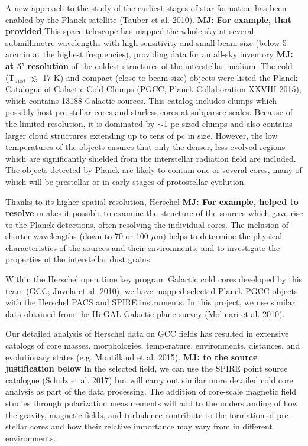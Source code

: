 \documentclass[11pt]{amsart}
\begin{document}
A new approach to the study of the earliest stages of star formation
has been enabled by the Planck satellite (Tauber et al.
2010). {\bf MJ: For example, that provided} 
This space telescope has mapped the whole sky at several
submillimetre wavelengths with high sensitivity and small
beam size (below 5 arcmin
at the highest frequencies), providing data
for an all-sky inventory 
{\bf MJ: at 5' resolution}
of the coldest structures of the interstellar
medium. 
The cold (T$_{dust}$ $\lesssim$ 17 K) and compact (close to beam
size) objects were listed the Planck Catalogue of Galactic Cold Clumps (PGCC, Planck
Collaboration XXVIII 2015), which contains 13188 Galactic
sources. 
This  catalog includes clumps
which possibly host pre-stellar cores and starless cores at subparsec
scales. Because of the limited resolution, it is dominated
by $\sim$1 pc sized clumps and also contains larger cloud structures
extending up to tens of pc in size. However, the low temperatures
of the objects ensures that only the denser, less evolved
regions which are significantly shielded from the interstellar radiation
field are included. The objects detected by Planck are
likely to contain one or several cores, many of which will be prestellar
or in early stages of protostellar evolution. 

Thanks to its higher spatial resolution, 
Herschel 
{\bf MJ: For example, helped to resolve} m
akes it possible to examine the structure of the
sources which gave rise to the Planck detections, often resolving
the individual cores. The inclusion of shorter wavelengths
(down to 70 or 100 $\mu$m) helps to determine the physical characteristics
of the sources and their environments, and to investigate
the properties of the interstellar dust grains. 

Within the Herschel open time key program Galactic
cold cores developed by this team (GCC; Juvela et al. 2010), we have mapped selected
Planck PGCC objects with the Herschel PACS
and SPIRE
instruments. 
In this project, we use similar data obtained from the Hi-GAL Galactic plane survey (Molinari et al. 2010).

Our detailed analysis of Herschel data on GCC fields has resulted in extensive catalogs of core masses, morphologies, temperature, environments, distances, and evolutionary states (e.g. Montillaud et al. 2015). 
{\bf MJ: to the source justification below}
In the selected field, we can use the SPIRE point source catalogue (Schulz et al. 2017) but will carry out similar more detailed cold core analysis as part of the data processing.
The addition of core-scale magnetic field studies through polarization
measurements will add to the understanding of how the gravity, magnetic
fields, and turbulence contribute to the formation of pre-stellar cores and how their relative importance may vary from
in different environments.
\end{document}
